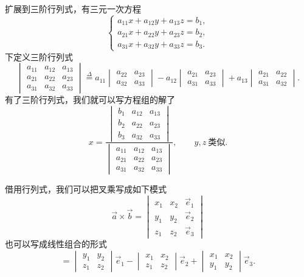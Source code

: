 \documentclass[UTF8,11pt]{ctexart}
\theoremstyle{cnthm}
\begin{document}
扩展到三阶行列式，有三元一次方程
\[
\begin{cases}
a_{11}x+a_{12}y+a_{13}z=b_1,\\
a_{21}x+a_{22}y+a_{23}z=b_2,\\
a_{31}x+a_{32}y+a_{33}z=b_3 .
\end{cases}
\]
下定义三阶行列式
\[
\begin{vmatrix}
a_{11} & a_{12} & a_{13}\\
a_{21} & a_{22} & a_{23}\\
a_{31} & a_{32} & a_{33}
\end{vmatrix}
\stackrel{\Delta}{=}
a_{11}\begin{vmatrix}
a_{22} & a_{23}\\
a_{32} & a_{33}
\end{vmatrix}
-a_{12}\begin{vmatrix}
a_{21} & a_{23}\\
a_{31} & a_{33}
\end{vmatrix}
+a_{13}\begin{vmatrix}
a_{21} & a_{22}\\
a_{31} & a_{32}
\end{vmatrix}.
\]
有了三阶行列式，我们就可以写方程组的解了
\[
x=\frac{
\begin{vmatrix}
b_1 & a_{12} & a_{13}\\
b_2 & a_{22} & a_{23}\\
b_3 & a_{32} & a_{33}
\end{vmatrix}
}{
\begin{vmatrix}
a_{11} & a_{12} & a_{13}\\
a_{21} & a_{22} & a_{23}\\
a_{31} & a_{32} & a_{33}
\end{vmatrix}
},\qquad
y,z\ \text{类似}.
\]

借用行列式，我们可以把叉乘写成如下模式
\[
\vec a\times\vec b=
\begin{vmatrix}
x_1 & x_2 & \vec e_1\\
y_1 & y_2 & \vec e_2\\
z_1 & z_2 & \vec e_3
\end{vmatrix}
\]
也可以写成线性组合的形式
\[
=\begin{vmatrix}
y_1 & y_2\\
z_1 & z_2
\end{vmatrix}\vec e_1
-\begin{vmatrix}
x_1 & x_2\\
z_1 & z_2
\end{vmatrix}\vec e_2
+\begin{vmatrix}
x_1 & x_2\\
y_1 & y_2
\end{vmatrix}\vec e_3 .
\]
\end{document}
